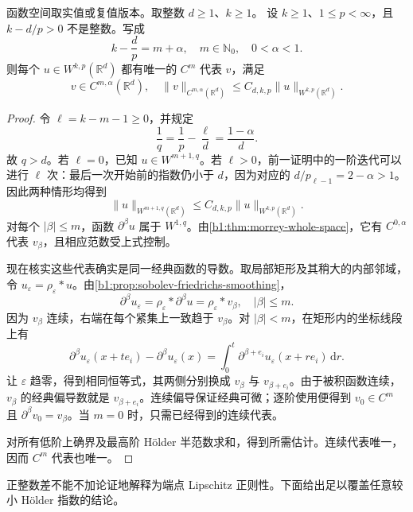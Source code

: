 \begin{theorem}\label{b1:thm:higher-order-holder-embedding}
函数空间取实值或复值版本。取整数 \(d\geq1\)、\(k\geq1\)。
设 \(k\ge1\)、\(1\le p<\infty\)，且 \(k-d/p>0\) 不是整数。写成
\[
 k-\frac dp=m+\alpha,\quad m\in\mathbb N_0,\quad 0<\alpha<1.
\]
则每个 \(u\in W^{k,p}(\mathbb R^d)\) 都有唯一的 \(C^m\) 代表 \(v\)，满足
\[
 v\in C^{m,\alpha}(\mathbb R^d),\quad
 \|v\|_{C^{m,\alpha}(\mathbb R^d)}
 \le C_{d,k,p}\|u\|_{W^{k,p}(\mathbb R^d)}.
\]
\end{theorem}
\begin{proof}
令 \(\ell=k-m-1\ge0\)，并规定
\[
 \frac1q=\frac1p-\frac\ell d=\frac{1-\alpha}{d}.
\]
故 \(q>d\)。若 \(\ell=0\)，已知 \(u\in W^{m+1,q}\)。若 \(\ell>0\)，前一证明中的一阶迭代可以进行 \(\ell\) 次：最后一次开始前的指数仍小于 \(d\)，因为对应的 \(d/p_{\ell-1}=2-\alpha>1\)。因此两种情形均得到
\[
 \|u\|_{W^{m+1,q}(\mathbb R^d)}
 \le C_{d,k,p}\|u\|_{W^{k,p}(\mathbb R^d)}.
\]
对每个 \(|\beta|\le m\)，函数 \(\partial^\beta u\) 属于 \(W^{1,q}\)。由\cref{b1:thm:morrey-whole-space}，它有 \(C^{0,\alpha}\) 代表 \(v_\beta\)，且相应范数受上式控制。

现在核实这些代表确实是同一经典函数的导数。取局部矩形及其稍大的内部邻域，令 \(u_\varepsilon=\rho_\varepsilon*u\)。由\cref{b1:prop:sobolev-friedrichs-smoothing}，
\[
 \partial^\beta u_\varepsilon
 =\rho_\varepsilon*\partial^\beta u
 =\rho_\varepsilon*v_\beta,\quad |\beta|\le m.
\]
因为 \(v_\beta\) 连续，右端在每个紧集上一致趋于 \(v_\beta\)。对 \(|\beta|<m\)，在矩形内的坐标线段上有
\[
 \partial^\beta u_\varepsilon(x+te_i)-\partial^\beta u_\varepsilon(x)
 =\int_0^t\partial^{\beta+e_i}u_\varepsilon(x+re_i)\,\mathrm dr.
\]
让 \(\varepsilon\) 趋零，得到相同恒等式，其两侧分别换成 \(v_\beta\) 与 \(v_{\beta+e_i}\)。由于被积函数连续，\(v_\beta\) 的经典偏导数就是 \(v_{\beta+e_i}\)。连续偏导保证经典可微；逐阶使用便得到
\(v_0\in C^m\) 且 \(\partial^\beta v_0=v_\beta\)。当 \(m=0\) 时，只需已经得到的连续代表。

对所有低阶上确界及最高阶 Hölder 半范数求和，得到所需估计。连续代表唯一，因而 \(C^m\) 代表也唯一。
\end{proof}

正整数差不能不加论证地解释为端点 Lipschitz 正则性。下面给出足以覆盖任意较小 Hölder 指数的结论。

